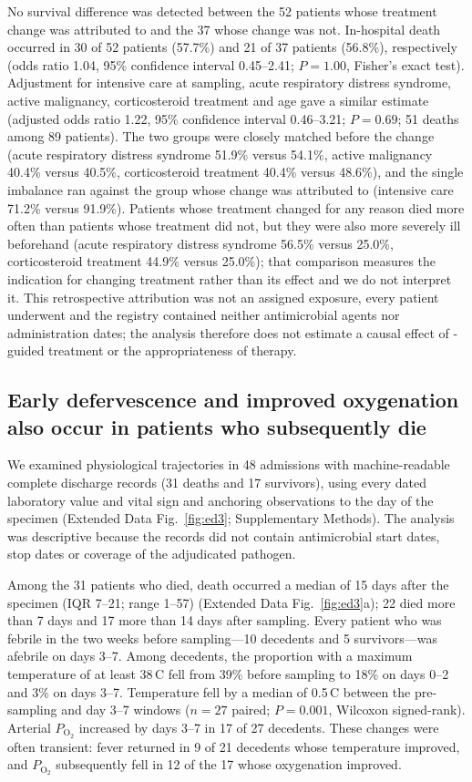 No survival difference was detected between the 52 patients whose treatment change was attributed to \mngs and the 37 whose change was not. In-hospital death occurred in 30 of 52 patients (57.7\%) and 21 of 37 patients (56.8\%), respectively (odds ratio 1.04, 95\% confidence interval 0.45--2.41; $P = 1.00$, Fisher's exact test). Adjustment for intensive care at sampling, acute respiratory distress syndrome, active malignancy, corticosteroid treatment and age gave a similar estimate (adjusted odds ratio 1.22, 95\% confidence interval 0.46--3.21; $P = 0.69$; 51 deaths among 89 patients). The two groups were closely matched before the change (acute respiratory distress syndrome 51.9\% versus 54.1\%, active malignancy 40.4\% versus 40.5\%, corticosteroid treatment 40.4\% versus 48.6\%), and the single imbalance ran against the group whose change was attributed to \mngs (intensive care 71.2\% versus 91.9\%). Patients whose treatment changed for any reason died more often than patients whose treatment did not, but they were also more severely ill beforehand (acute respiratory distress syndrome 56.5\% versus 25.0\%, corticosteroid treatment 44.9\% versus 25.0\%); that comparison measures the indication for changing treatment rather than its effect and we do not interpret it. This retrospective attribution was not an assigned exposure, every patient underwent \mngs and the registry contained neither antimicrobial agents nor administration dates; the analysis therefore does not estimate a causal effect of \mngs-guided treatment or the appropriateness of therapy.

\subsection*{Early defervescence and improved oxygenation also occur in patients who subsequently die}

We examined physiological trajectories in 48 \kmuh admissions with machine-readable complete discharge records (31 deaths and 17 survivors), using every dated laboratory value and vital sign and anchoring observations to the day of the \mngs specimen (Extended Data Fig.~\ref{fig:ed3}; Supplementary Methods). The analysis was descriptive because the records did not contain antimicrobial start dates, stop dates or coverage of the adjudicated pathogen.

Among the 31 patients who died, death occurred a median of 15 days after the \mngs specimen (IQR 7--21; range 1--57) (Extended Data Fig.~\ref{fig:ed3}a); 22 died more than 7 days and 17 more than 14 days after sampling. Every patient who was febrile in the two weeks before sampling---10 decedents and 5 survivors---was afebrile on days 3--7. Among decedents, the proportion with a maximum temperature of at least 38\,\textdegree C fell from 39\% before sampling to 18\% on days 0--2 and 3\% on days 3--7. Temperature fell by a median of 0.5\,\textdegree C between the pre-sampling and day 3--7 windows ($n=27$ paired; $P = 0.001$, Wilcoxon signed-rank). Arterial $P_{\mathrm{O}_2}$ increased by days 3--7 in 17 of 27 decedents. These changes were often transient: fever returned in 9 of 21 decedents whose temperature improved, and $P_{\mathrm{O}_2}$ subsequently fell in 12 of the 17 whose oxygenation improved.

